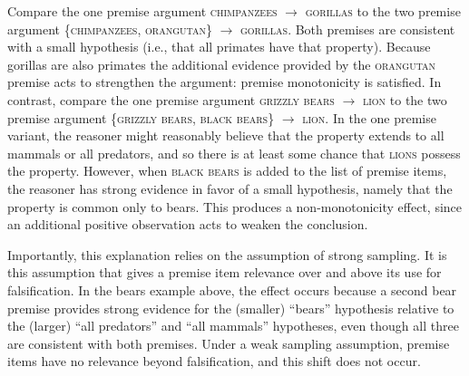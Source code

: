 \documentclass[doc,12pt]{apa}
\newcommand{\category}[1]{\textsc{#1}}
\newcommand{\oneargument}[2]{{#1} $\rightarrow$ {#2}}
\newcommand{\twoargument}[3]{\{{#1}, {#2}\} $\rightarrow$ {#3}}
\begin{document}
Compare the one premise argument \oneargument{\category{chimpanzees}}{\category{gorillas}} to the two premise argument \twoargument{\category{chimpanzees}}{\category{orangutan}}{\category{gorillas}}. Both premises are consistent with a small hypothesis (i.e., that all primates have that property). Because gorillas are also primates the additional evidence provided by the \category{orangutan} premise acts to strengthen the argument: premise monotonicity is satisfied.  In contrast, compare the one premise argument \oneargument{\category{grizzly bears}}{\category{lion}} to the two premise argument \twoargument{\category{grizzly bears}}{\category{black bears}}{\category{lion}}. In the one premise variant, the reasoner might reasonably believe that the property extends to all mammals or all predators, and so there is at least some chance that \category{lions} possess the property. However, when \category{black bears} is added to the list of premise items, the reasoner has strong evidence in favor of a small hypothesis, namely that the property is common only to bears. This produces a non-monotonicity effect, since an additional positive observation acts to weaken the conclusion.

Importantly, this explanation relies on the assumption of strong sampling. It is this assumption that gives a premise item relevance over and above its use for falsification. In the bears example above, the effect occurs because a second bear premise provides strong evidence for the (smaller) ``bears'' hypothesis relative to the  (larger) ``all predators'' and ``all mammals'' hypotheses, even though all three are consistent with both premises. Under a weak sampling assumption, premise items have no relevance beyond falsification, and this shift does not occur.
\end{document}
